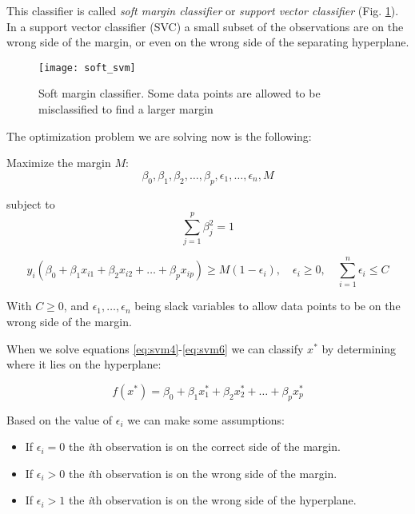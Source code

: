 This classifier is called \textit{soft margin classifier} or \textit{support vector classifier} (Fig. \ref{fig:soft_svm}). \\
In a support vector classifier (SVC) a small subset of the observations are on the wrong side of the margin, or even on the wrong side of the separating hyperplane.

\begin{figure}[H]
	\centering
	\texttt{[image: soft\_svm]}
	\caption{Soft margin classifier. Some data points are allowed to be misclassified to find a larger margin \cite{soft_svm}}
	\label{fig:soft_svm}
\end{figure}

The optimization problem we are solving now is the following: 

Maximize the margin $M$:
\begin{equation} \label{eq:svm4}
\beta_0, \beta_1, \beta_2, \dots, \beta_p, \epsilon_1, \dots, \epsilon_n, M
\end{equation}

subject to
\begin{equation} \label{eq:svm5}
\sum_{j=1}^{p}\beta^2_j = 1
\end{equation}

\begin{equation} \label{eq:svm6}
y_i(\beta_0 + \beta_1 x_{i1} + \beta_2 x_{i2} + \dots + \beta_p x_{ip}) \ge M(1 - \epsilon_i), \quad \epsilon_i \ge 0, \quad \sum_{i=1}^{n}\epsilon_i \le C
\end{equation}

With $C \ge 0$, and $\epsilon_1, \dots, \epsilon_n$ being slack variables to allow data points to be on the wrong side of the margin.

When we solve equations \ref{eq:svm4}-\ref{eq:svm6} we can classify $x^*$ by determining where it lies on the hyperplane:

\begin{equation} \label{eq:svm7}
f(x^*) = \beta_0 + \beta_1 x_{1}^* + \beta_2 x_{2}^* + \dots + \beta_p x_{p}^*
\end{equation}

Based on the value of $\epsilon_i$ we can make some assumptions:
\begin{itemize}[noitemsep]
	\item If $\epsilon_i = 0$ the \textit{i}th observation is on the correct side of the margin.
	\item If $\epsilon_i > 0$ the \textit{i}th observation is on the wrong side of the margin.
	\item If $\epsilon_i > 1$ the \textit{i}th observation is on the wrong side of the hyperplane.
\end{itemize}

